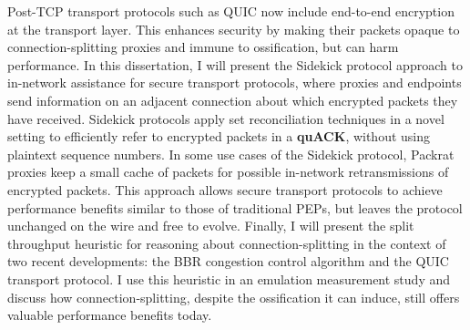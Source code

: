 
Post-TCP transport protocols such as QUIC now include end-to-end encryption at
the transport layer. This enhances security by making their packets opaque to
connection-splitting proxies and immune to ossification, but can harm
performance. In this dissertation, I will present the Sidekick protocol
approach to in-network assistance for secure transport protocols, where proxies
and endpoints send information on an adjacent connection about which encrypted
packets they have received. Sidekick protocols apply set reconciliation
techniques in a novel setting to efficiently refer to encrypted packets in
a \textbf{quACK}, without using plaintext sequence numbers. In some use cases
of the Sidekick protocol, Packrat proxies keep a small cache of packets for
possible in-network retransmissions of encrypted packets. This approach allows
secure transport protocols to achieve performance benefits similar to those of
traditional PEPs, but leaves the protocol unchanged on the wire and free to
evolve. Finally, I will present the split throughput heuristic for reasoning
about connection-splitting in the context of two recent developments: the BBR
congestion control algorithm and the QUIC transport protocol. I use this
heuristic in an emulation measurement study and discuss how
connection-splitting, despite the ossification it can induce, still offers
valuable performance benefits today.